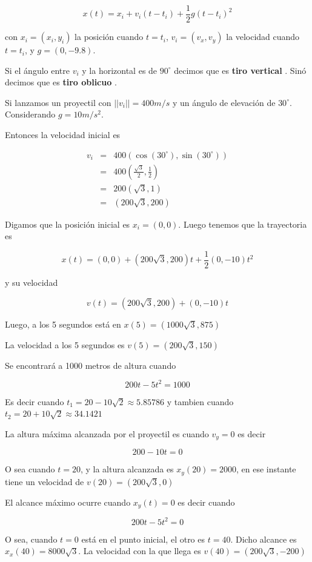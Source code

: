 $$ x(t) = x_i + v_i (t-t_i) + \frac{1}{2} g (t-t_i)^2 $$

con $x_i = (x_i, y_i)$ la posición cuando $t= t_i$, $v_i = (v_x,v_y)$ la velocidad cuando $t=t_i$, y $g = (0, -9.8)$.

Si el ángulo entre $v_i$ y la horizontal es de $90^{\circ}$ decimos que es \textbf{tiro vertical} \label{tiro_vertical} .  Sinó decimos que es \textbf{tiro oblicuo} \label{tiro_oblicuo}. 

\begin{example}
Si lanzamos un proyectil con $||v_i|| = 400 m/s$ y un ángulo de elevación de $30^{\circ}$.  Considerando $g = 10 m/s^2$.

Entonces la velocidad inicial es

\begin{eqnarray*}
v_i &=& 400 ( \cos(30^{\circ}), \sin(30^{\circ})) \\
 &=& 400 ( \frac{\sqrt{3}}{2}, \frac{1}{2}) \\
 &=& 200 ( \sqrt{3}, 1) \\
 &=& ( 200 \sqrt{3}, 200) 
\end{eqnarray*}

Digamos que la posición inicial es $x_i = (0,0)$.  Luego tenemos que la trayectoria es

$$ x(t) = (0,0) + ( 200 \sqrt{3}, 200) t + \frac{1}{2} (0, -10) t^2 $$

y su velocidad

$$ v(t) = (200\sqrt{3}, 200) + (0, -10) t $$

Luego, a los 5 segundos está en $x(5) = (1000 \sqrt{3}, 875)$

La velocidad a los 5 segundos es $v(5) = (200 \sqrt{3}, 150)$

Se encontrará a 1000 metros de altura cuando

$$ 200 t - 5 t^2 = 1000 $$

Es decir cuando $t_1 = 20 - 10\sqrt{2} \approx 5.85786 $ y tambien cuando $t_2 = 20 + 10\sqrt{2} \approx 34.1421$

La altura máxima alcanzada por el proyectil es cuando $v_y = 0$ es decir

$$ 200 - 10t = 0 $$

O sea cuando $t = 20$, y la altura alcanzada es $x_y(20) = 2000$, en ese instante tiene un velocidad de $v(20) = (200 \sqrt{3}, 0)$

El alcance máximo ocurre cuando $x_y(t) = 0$ es decir cuando

$$ 200 t - 5t^2 = 0 $$

O sea, cuando $t = 0$ está en el punto inicial, el otro es $t = 40$.  Dicho alcance es $x_x(40) = 8000 \sqrt{3}$.  La velocidad con la que llega es $v(40) = (200 \sqrt{3}, -200)$
\end{example}
